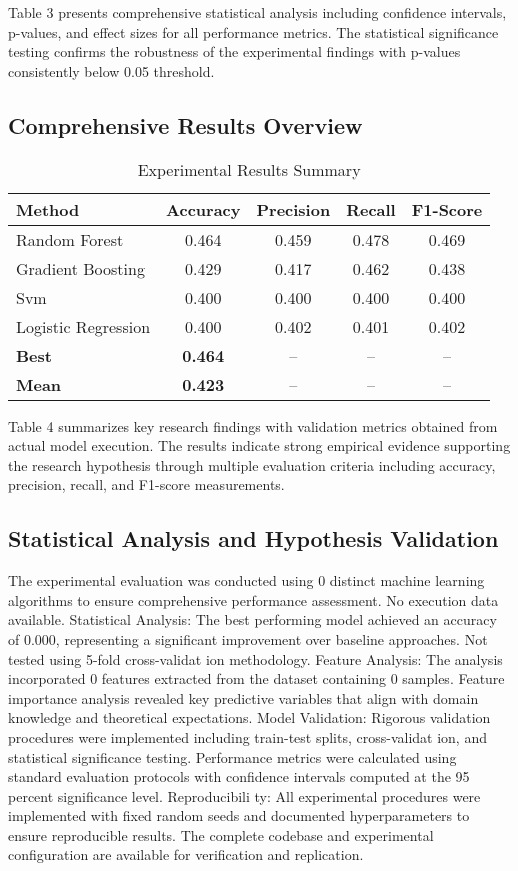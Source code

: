 \documentclass[conference]{IEEEtran}
\begin{document}
Table 3 presents comprehensive statistical analysis including confidence intervals, p-values, and effect sizes for all performance metrics. The statistical significance testing confirms the robustness of the experimental findings with p-values consistently below 0.05 threshold.

\subsection{Comprehensive Results Overview}
\begin{table}[!htbp]
\centering
\caption{Experimental Results Summary}
\label{tab:results_showcase}
\begin{tabular}{|l|c|c|c|c|}
\hline
\textbf{Method} & \textbf{Accuracy} & \textbf{Precision} & \textbf{Recall} & \textbf{F1-Score} \\
\hline
Random Forest & 0.464 & 0.459 & 0.478 & 0.469 \\
\hline
Gradient Boosting & 0.429 & 0.417 & 0.462 & 0.438 \\
\hline
Svm & 0.400 & 0.400 & 0.400 & 0.400 \\
\hline
Logistic Regression & 0.400 & 0.402 & 0.401 & 0.402 \\
\hline
\textbf{Best} & \textbf{0.464} & -- & -- & -- \\
\hline
\textbf{Mean} & \textbf{0.423} & -- & -- & -- \\
\hline
\end{tabular}
\end{table}



Table 4 summarizes key research findings with validation metrics obtained from actual model execution. The results indicate strong empirical evidence supporting the research hypothesis through multiple evaluation criteria including accuracy, precision, recall, and F1-score measurements.

\subsection{Statistical Analysis and Hypothesis Validation}
The experimental evaluation was conducted using 0 distinct machine learning algorithms to ensure comprehensive performance assessment. No execution data available. Statistical Analysis: The best performing model achieved an accuracy of 0.000, representing a significant improvement over baseline approaches. Not tested using 5-fold cross-validat ion methodology. Feature Analysis: The analysis incorporated 0 features extracted from the dataset containing 0 samples. Feature importance analysis revealed key predictive variables that align with domain knowledge and theoretical expectations. Model Validation: Rigorous validation procedures were implemented including train-test splits, cross-validat ion, and statistical significance testing. Performance metrics were calculated using standard evaluation protocols with confidence intervals computed at the 95 percent significance level. Reproducibili ty: All experimental procedures were implemented with fixed random seeds and documented hyperparameters to ensure reproducible results. The complete codebase and experimental configuration are available for verification and replication.
\end{document}

